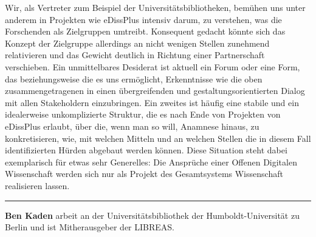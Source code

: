 \documentclass[a4paper,
fontsize=11pt,
oneside,
numbers=noperiodatend,
parskip=half-,
bibliography=totoc,
final
]{scrartcl}
\begin{document}
Wir, als Vertreter zum Beispiel der Universitätsbibliotheken, bemühen
uns unter anderem in Projekten wie eDissPlus intensiv darum, zu
verstehen, was die Forschenden als Zielgruppen umtreibt. Konsequent
gedacht könnte sich das Konzept der Zielgruppe allerdings an nicht
wenigen Stellen zunehmend relativieren und das Gewicht deutlich in
Richtung einer Partnerschaft verschieben. Ein unmittelbares Desiderat
ist aktuell ein Forum oder eine Form, das beziehungsweise die es uns
ermöglicht, Erkenntnisse wie die oben zusammengetragenen in einen
übergreifenden und gestaltungsorientierten Dialog mit allen Stakeholdern
einzubringen. Ein zweites ist häufig eine stabile und ein idealerweise
unkomplizierte Struktur, die es nach Ende von Projekten von eDissPlus
erlaubt, über die, wenn man so will, Anamnese hinaus, zu konkretisieren,
wie, mit welchen Mitteln und an welchen Stellen die in diesem Fall
identifizierten Hürden abgebaut werden können. Diese Situation steht
dabei exemplarisch für etwas sehr Generelles: Die Ansprüche einer
Offenen Digitalen Wissenschaft werden sich nur als Projekt des
Gesamtsystems Wissenschaft realisieren lassen.

\begin{center}\rule{0.5\linewidth}{\linethickness}\end{center}

\textbf{Ben Kaden} arbeit an der Universitätsbibliothek der
Humboldt-Universität zu Berlin und ist Mitherausgeber der LIBREAS.
\end{document}
